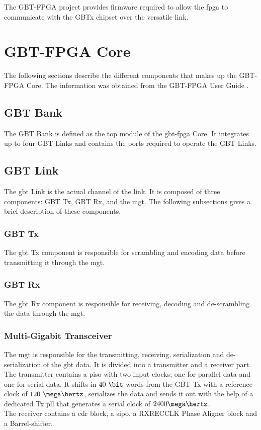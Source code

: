 \documentclass[main.tex]{subfiles}
\begin{document}

The GBT-FPGA project provides firmware required to allow the \gls{fpga} to communicate with the GBTx chipset over the versatile link.

\section{GBT-FPGA Core}
The following sections describe the different components that makes up the GBT-FPGA Core. The information was obtained from the GBT-FPGA User Guide \cite{gbt_fpga}.

\subsection{GBT Bank}
The GBT Bank is defined as the top module of the \gls{gbt}-\gls{fpga} Core. It integrates up to four GBT Links and contains the ports required to operate the GBT Links.

\subsection{GBT Link}
The \gls{gbt} Link is the actual channel of the link. It is composed of three components: GBT Tx, GBT Rx, and the \gls{mgt}. The following subsections gives a brief description of these components.

\subsubsection{GBT Tx}

The \gls{gbt} Tx component is responsible for scrambling and encoding data before transmitting it through the \gls{mgt}.

\subsubsection{GBT Rx}

The \gls{gbt} Rx component is responsible for receiving, decoding and de-scrambling the data through the \gls{mgt}.

\subsubsection{Multi-Gigabit Transceiver}
The \gls{mgt} is responsible for the transmitting, receiving, serialization and de-serialization of the \gls{gbt} data. It is divided into a transmitter and a receiver part.\\ The transmitter contains a \gls{piso} with two input clocks; one for parallel data and one for serial data. It shifts in $40~\bit$ words from the GBT Tx with a reference clock of $120~\mega\hertz$, serializes the data and sends it out with the help of a dedicated Tx \gls{pll} that generates a serial clock of $2400 \mega\hertz$.\\ The receiver contains a \gls{cdr} block, a \gls{sipo}, a RXRECCLK Phase Aligner block and a Barrel-shifter. 



\end{document}

